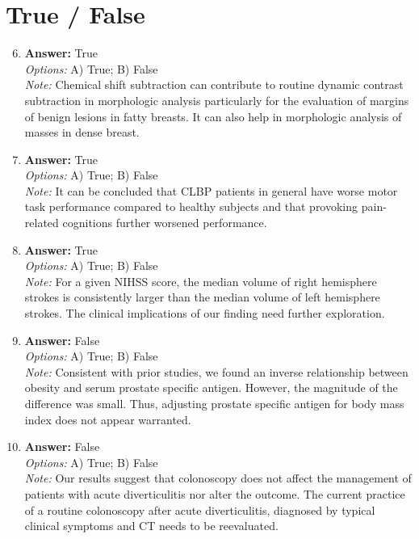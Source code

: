 \documentclass[12pt]{article}
\begin{document}
\section*{True / False}
\begin{enumerate}[label=\arabic*.]
\setcounter{enumi}{5}
\item \textbf{Answer:} True
\\ \textit{Options:} A) True; B) False
\\ \textit{Note:} Chemical shift subtraction can contribute to routine dynamic contrast subtraction in morphologic analysis particularly for the evaluation of margins of benign lesions in fatty breasts. It can also help in morphologic analysis of masses in dense breast.
\item \textbf{Answer:} True
\\ \textit{Options:} A) True; B) False
\\ \textit{Note:} It can be concluded that CLBP patients in general have worse motor task performance compared to healthy subjects and that provoking pain-related cognitions further worsened performance.
\item \textbf{Answer:} True
\\ \textit{Options:} A) True; B) False
\\ \textit{Note:} For a given NIHSS score, the median volume of right hemisphere strokes is consistently larger than the median volume of left hemisphere strokes. The clinical implications of our finding need further exploration.
\item \textbf{Answer:} False
\\ \textit{Options:} A) True; B) False
\\ \textit{Note:} Consistent with prior studies, we found an inverse relationship between obesity and serum prostate specific antigen. However, the magnitude of the difference was small. Thus, adjusting prostate specific antigen for body mass index does not appear warranted.
\item \textbf{Answer:} False
\\ \textit{Options:} A) True; B) False
\\ \textit{Note:} Our results suggest that colonoscopy does not affect the management of patients with acute diverticulitis nor alter the outcome. The current practice of a routine colonoscopy after acute diverticulitis, diagnosed by typical clinical symptoms and CT needs to be reevaluated.
\end{enumerate}
\end{document}

